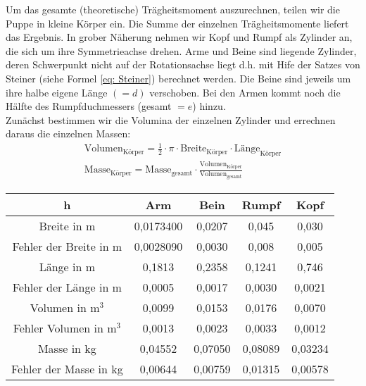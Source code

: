 Um das gesamte (theoretische) Trägheitsmoment auszurechnen, teilen wir die Puppe in kleine Körper ein. Die
Summe der einzelnen Trägheitsmomente liefert das Ergebnis.
In grober Näherung nehmen wir  Kopf und Rumpf als Zylinder an, die sich um ihre Symmetrieachse drehen.
Arme und Beine sind liegende Zylinder, deren Schwerpunkt nicht auf der Rotationsachse liegt d.h. mit Hife der Satzes von Steiner (siehe Formel \eqref{eq: Steiner}) berechnet werden.
Die Beine sind jeweils um ihre halbe eigene Länge $(=d)$ verschoben. Bei den Armen kommt noch die Hälfte des Rumpfduchmessers (gesamt $=e$) hinzu. \\
Zunächst bestimmen wir die Volumina der einzelnen Zylinder und errechnen daraus die einzelnen Massen:
\begin{align}
	\text{Volumen}_{\text{Körper}} = \frac{1}{2} \cdot \pi \cdot \text{Breite}_\text{Körper} \cdot \text{Länge}_\text{Körper} \\
	\text{Masse}_\text{Körper} = \text{Masse}_\text{gesamt} \cdot \frac{\text{Volumen}_\text{Körper}}{\text{Volumen}_\text{gesamt}}
\end{align}
\begin{center}
	\begin{tabular}{c|c|c|c|c}{h}
		 & Arm & Bein & Rumpf & Kopf \\
		 \hline \hline
		 Breite in m & 0,0173400 & 0,0207 & 0,045 & 0,030 \\
		 Fehler der Breite in m & 0,0028090 & 0,0030 & 0,008 & 0,005 \\
		 \hline
		 Länge in m & 0,1813 & 0,2358 & 0,1241 & 0,746 \\
	 Fehler der Länge in m & 0,0005 & 0,0017 & 0,0030 & 0,0021 \\
	 \hline
	 Volumen in $\text{m}^3$ & 0,0099 & 0,0153 & 0,0176 & 0,0070 \\
	 Fehler Volumen in $\text{m}^3$ & 0,0013 & 0,0023 & 0,0033 & 0,0012 \\
	 \hline
	 Masse in kg & 0,04552 & 0,07050 & 0,08089 & 0,03234 \\
	Fehler der Masse in kg & 0,00644 & 0,00759 & 0,01315 & 0,00578 \\
	\end{tabular}
\end{center}
\vspace{\baselineskip}

